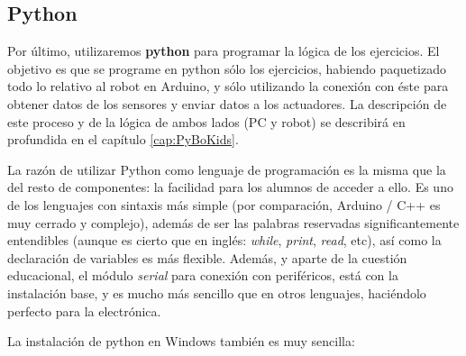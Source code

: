 \subsection{Python}\label{subsec:python}
Por último, utilizaremos \textbf{python} para programar la lógica de los ejercicios. El objetivo es que se programe en python sólo los ejercicios, habiendo paquetizado todo lo relativo al robot en Arduino, y sólo utilizando la conexión con éste para obtener datos de los sensores y enviar datos a los actuadores. La descripción de este proceso y de la lógica de ambos lados (PC y robot) se describirá en profundida en el capítulo \ref{cap:PyBoKids}.
\par La razón de utilizar Python como lenguaje de programación es la misma que la del resto de componentes: la facilidad para los alumnos de acceder a ello. Es uno de los lenguajes con sintaxis más simple (por comparación, Arduino / C++ es muy cerrado y complejo), además de ser las palabras reservadas significantemente entendibles (aunque es cierto que en inglés: \textit{while}, \textit{print}, \textit{read}, etc), así como la declaración de variables es más flexible. Además, y aparte de la cuestión educacional, el módulo \textit{serial} para conexión con periféricos, está con la instalación base, y es mucho más sencillo que en otros lenguajes, haciéndolo perfecto para la electrónica. 
\par La instalación de python en Windows también es muy sencilla:
